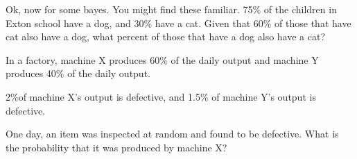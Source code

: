 \documentclass[11pt]{article}
\begin{document}
Ok, now for some bayes. You might find these familiar. 75$\%$ of the children in Exton school have a dog, and 30$\%$ have a cat. Given that 60$\%$ of those that have cat also have a dog, what percent of those that have a dog also have a cat?
\newline 
\newline
\newline 




In a factory, machine X produces 60$\%$ of the daily output and machine Y produces 40$\%$ of the daily output.

2$\%$of machine X's output is defective, and 1.5$\%$ of machine Y's output is defective.

One day, an item was inspected at random and found to be defective. What is the probability that it was produced by machine X?
\end{document}

